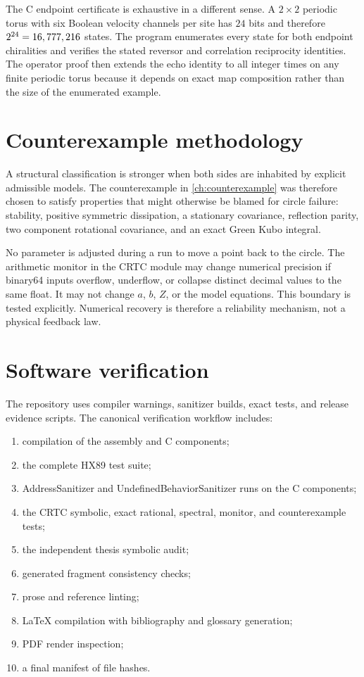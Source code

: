 The C endpoint certificate is exhaustive in a different sense. A $2\times2$ periodic torus with six Boolean velocity channels per site has $24$ bits and therefore $2^{24}=16,777,216{}$ states. The program enumerates every state for both endpoint chiralities and verifies the stated reversor and correlation reciprocity identities. The operator proof then extends the echo identity to all integer times on any finite periodic torus because it depends on exact map composition rather than the size of the enumerated example.

\section{Counterexample methodology}
A structural classification is stronger when both sides are inhabited by explicit admissible models. The counterexample in \cref{ch:counterexample} was therefore chosen to satisfy properties that might otherwise be blamed for circle failure: stability, positive symmetric dissipation, a stationary covariance, reflection parity, two component rotational covariance, and an exact Green Kubo integral.

No parameter is adjusted during a run to move a point back to the circle. The arithmetic monitor in the CRTC module may change numerical precision if binary64 inputs overflow, underflow, or collapse distinct decimal values to the same float. It may not change $a$, $b$, $Z$, or the model equations. This boundary is tested explicitly. Numerical recovery is therefore a reliability mechanism, not a physical feedback law.

\section{Software verification}
The repository uses compiler warnings, sanitizer builds, exact tests, and release evidence scripts. The canonical verification workflow includes:
\begin{enumerate}[label=\alph*)]
\item compilation of the assembly and C components;
\item the complete HX89 test suite;
\item AddressSanitizer and UndefinedBehaviorSanitizer runs on the C components;
\item the CRTC symbolic, exact rational, spectral, monitor, and counterexample tests;
\item the independent thesis symbolic audit;
\item generated fragment consistency checks;
\item prose and reference linting;
\item LaTeX compilation with bibliography and glossary generation;
\item PDF render inspection;
\item a final manifest of file hashes.
\end{enumerate}


